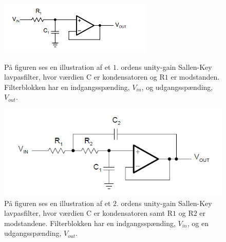 \begin{figure}[H]
	\centering
	\begin{minipage}[b]{0.45\textwidth}
		\includegraphics[width=\textwidth]{figures/cProblemloesning/Lavpasfilter1_teoretisk.PNG}
		\caption{På figuren ses en illustration af et $1$. ordens unity-gain Sallen-Key lavpasfilter, hvor værdien C er kondensatoren og R$1$ er modstanden. Filterblokken har en indgangsspænding, $V_{in}$, og udgangsspænding, $V_{out}$. \cite{Carter2013}}
		\label{fig:SallenKey1}
	\end{minipage}
	\hfill
	\begin{minipage}[b]{0.45\textwidth}
		\includegraphics[width=\textwidth]{figures/cProblemloesning/Sallenlavpas.PNG}
		\caption{På figuren ses en illustration af et $2$. ordens unity-gain Sallen-Key lavpasfilter, hvor værdien C er kondensatoren samt R$1$ og R$2$ er modstandene. Filterblokken har en indgangsspænding, $V_{in}$, og en udgangsspænding, $V_{out}$. \cite{Carter2013}}
		\label{fig:SallenKey2}
	\end{minipage}
\end{figure}

